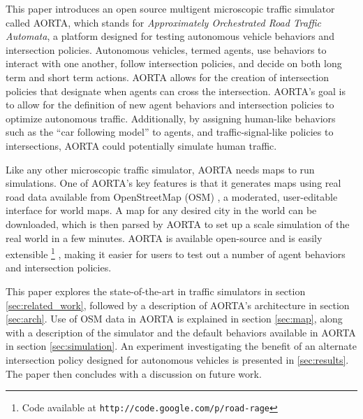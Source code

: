 \documentclass[letterpaper, 10 pt, conference]{ieeeconf}  %
\begin{document}

This paper introduces an open source multigent microscopic traffic simulator
called AORTA, which stands for \textit{Approximately Orchestrated Road Traffic
Automata}, a platform designed for testing autonomous vehicle behaviors and
intersection policies. Autonomous vehicles, termed agents, use
behaviors to interact with one another, follow intersection policies, and
decide on both long term and short term actions. AORTA allows for the creation
of intersection policies that designate when agents can cross the
intersection. AORTA's goal is to allow for the definition of new agent
behaviors and intersection policies to optimize autonomous traffic.
Additionally, by assigning human-like behaviors such as the ``car following
model'' \cite{brackstone1999car} to agents, and traffic-signal-like policies to
intersections, AORTA could potentially simulate human traffic.

Like any other microscopic traffic simulator, AORTA needs maps to run
simulations. One of AORTA's key features is that it generates maps using real
road data available from OpenStreetMap (OSM) \cite{osm}, a moderated,
user-editable interface for world maps. A map for any desired city in the world
can be downloaded, which is then parsed by AORTA to set up a scale simulation of
the real world in a few minutes. AORTA is available open-source and is easily
extensible \footnote{Code available at
\texttt{http://code.google.com/p/road-rage}} , making it easier for users to test out a number of agent
behaviors and intersection policies.

This paper explores the state-of-the-art in traffic simulators in section
\ref{sec:related_work}, followed by a description of AORTA's architecture in
section \ref{sec:arch}.  Use of OSM data in AORTA is explained in section
\ref{sec:map}, along with a description of the simulator and the default
behaviors available in AORTA in section \ref{sec:simulation}. An experiment
investigating the benefit of an alternate intersection policy designed for
autonomous vehicles is presented in \ref{sec:results}. The paper then concludes
with a discussion on future work.
\end{document}
